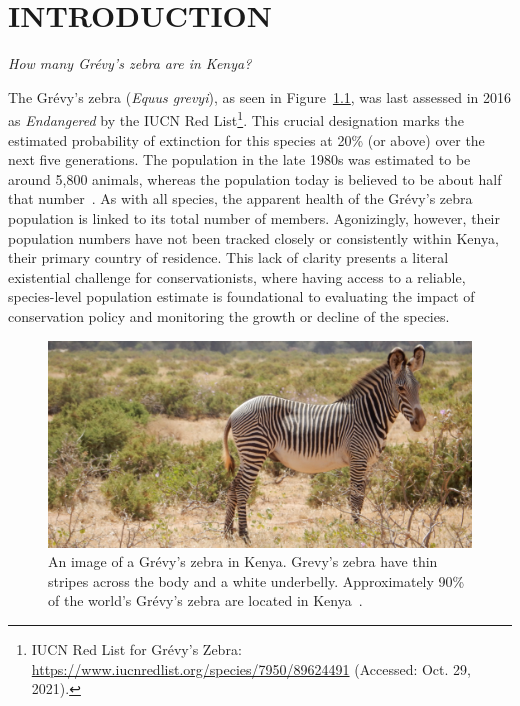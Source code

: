 \chapter{INTRODUCTION} \label{chapter:introduction}

\noindent \textit{How many Gr\'evy's zebra are in Kenya?}

\hfill

\noindent The Gr\'evy's zebra (\textit{Equus grevyi}), as seen in Figure~\ref{fig:grevys}, was last assessed in 2016 as \textit{Endangered} by the IUCN Red List\footnote{IUCN Red List for Gr\'evy's Zebra: \url{https://www.iucnredlist.org/species/7950/89624491} (Accessed: Oct. 29, 2021).}.  This crucial designation marks the estimated probability of extinction for this species at 20\% (or above) over the next five generations.  The population in the late 1980s was estimated to be around 5,800 animals, whereas the population today is believed to be about half that number~\cite{rubenstein_equus_2016}.  As with all species, the apparent health of the Gr\'evy's zebra population is linked to its total number of members. Agonizingly, however, their population numbers have not been tracked closely or consistently within Kenya, their primary country of residence.  This lack of clarity presents a literal existential challenge for conservationists, where having access to a reliable, species-level population estimate is foundational to evaluating the impact of conservation policy and monitoring the growth or decline of the species.

\begin{figure}[!t]
    \begin{center}
        \includegraphics[width=0.8\linewidth]{resources/grevys-color.pdf}
    \end{center}
    \caption{An image of a Gr\'evy's zebra in Kenya.  Grevy's zebra have thin stripes across the body and a white underbelly.  Approximately 90\% of the world's Gr\'evy's zebra are located in Kenya~\cite{rubenstein_equus_2016}.}
    \label{fig:grevys}
\end{figure}

